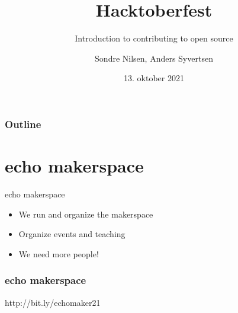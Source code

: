 \documentclass[presentation]{beamer}
\title{Hacktoberfest}
\subtitle{Introduction to contributing to open source}
\date{13. oktober 2021}
\author{Sondre Nilsen, Anders Syvertsen}
\institute{echo makerspace}
\begin{document}
  \maketitle

  \begin{frame}
    \frametitle{Outline}
    \tableofcontents
  \end{frame}

  \section*{echo makerspace}
  \begin{frame}{echo makerspace}
    \begin{itemize}
      \item We run and organize the makerspace
      \item Organize events and teaching
      \item We need more people!
    \end{itemize}
  \end{frame}
  \begin{frame}[standout]
    \frametitle{echo makerspace}
    \LARGE{http://bit.ly/echomaker21}
  \end{frame}
\end{document}
